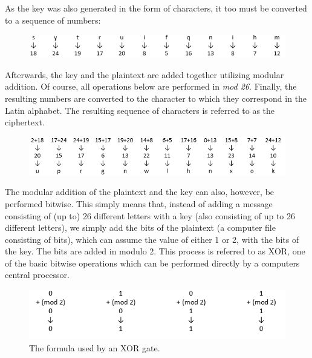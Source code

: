 \documentclass[12pt]{report}
\theoremstyle{definition}
\theoremstyle{remark}
\begin{document}

As the key was also generated in the form of characters, it too must be converted to a sequence of numbers:

\begin{figure}[H]
\centering
\includegraphics[scale=1]{Table2.PNG}
\end{figure}

Afterwards, the key and the plaintext are added together utilizing modular addition. Of course, all operations below are performed in \textit{mod 26}. Finally, the resulting numbers are converted to the character to which they correspond in the Latin alphabet. The resulting sequence of characters is referred to as the ciphertext.

\begin{figure}[H]
\centering
\includegraphics[scale=1]{Table3.PNG}
\end{figure}

The modular addition of the plaintext and the key can also, however, be performed bitwise. This simply means that, instead of adding a message consisting of (up to) 26 different letters with a key (also consisting of up to 26 different letters), we simply add the bits of the plaintext (a computer file consisting of bits), which can assume the value of either 1 or 2, with the bits of the key. The bits are added in modulo 2. This process is referred to as XOR, one of the basic bitwise operations which can be performed directly by a computers central processor.

\begin{figure}[H]
\centering
\includegraphics[scale=1]{XORgate.PNG}
\caption{The formula used by an XOR gate.}
\end{figure}
\end{document}
